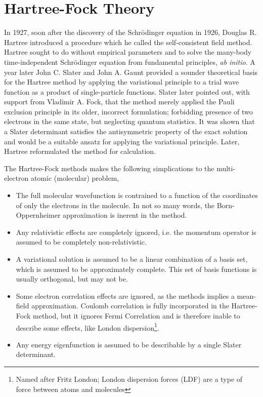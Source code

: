 \chapter{Hartree-Fock Theory} 

    In 1927, soon after the discovery of the Schrödinger equation in 1926, Douglas R.
    Hartree introduced a procedure which he called the self-consistent field 
    method\cite{hartree1928wave}. 
    Hartree sought to do without empirical parameters and
    to solve the many-body time-independent Schrödinger equation from fundamental
    principles, \emph{ab initio}. A year later John C. Slater and John A. Gaunt 
    provided a sounder theoretical basis for the Hartree method by applying the 
    variational principle to a trial wave function as a product of single-particle
    functions\cite{slater1928self}\cite{gaunt1928theory}. 
    Slater later pointed out, with support from Vladimir A. Fock, that the method
    merely applied the Pauli exclusion principle in its older, incorrect formulation;
    forbidding presence of two electrons in the same state, but neglecting 
    quantum statistics\cite{slater1930note}\cite{fock1930naherungsmethode}. It was
    shown that a Slater determinant satisfies the antisymmetric property of the
    exact solution and would be a suitable ansatz for applying the variational
    principle. Later, Hartree reformulated the method for 
    calculation\cite{hartree1935self}.

    The Hartree-Fock methods makes the following simplications to the multi-electron 
    atomic (molecular) problem,
    \begin{itemize}
        \item The full molecular wavefunction is contrained to a function of the
            coordinates of only the electrons in the molecule. In not so many words,
            the Born-Oppernheimer approximation is inerent in the method.
        \item Any relativistic effects are completely ignored, i.e. the momentum
            operator is assumed to be completely non-relativistic.
        \item A variational solution is assumed to be a linear combination of a basis
            set, which is assumed to be approximately complete. This set of basis
            functions is usually orthogonal, but may not be. 
        \item Some electron correlation effects are ignored, as the methods implies
            a mean-field approximation. Coulomb correlation is fully incorporated 
            in the Hartree-Fock method, but it ignores Fermi Correlation and is
            therefore inable to describe some effects, like London 
            dispersion\footnote{Named after Fritz London; London dispersion
            forces (LDF) are a type of force between atoms and 
            molecules\cite{heitler1927wechselwirkung}}.
        \item Any energy eigenfunction is assumed to be describable by a single 
            Slater determinant. 
    \end{itemize}

